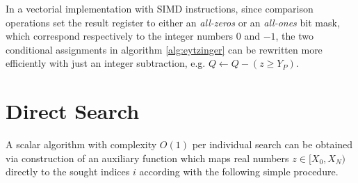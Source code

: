 \documentclass[preprint,1p,times]{elsarticle}
\begin{document}
In a vectorial implementation with SIMD instructions, since comparison operations set the result register to either an \textit{all-zeros} or an \textit{all-ones} bit mask, which correspond respectively to the integer numbers $0$ and $-1$, the two conditional assignments in algorithm \ref{alg:eytzinger} can be rewritten more efficiently with just an integer subtraction, e.g. $Q \leftarrow Q - (z \geq Y_P)$.



\section{Direct Search}
\label{sec:directmethod}
A scalar algorithm with complexity $O(1)$ per individual search can be obtained via construction of an auxiliary function which maps real numbers $z\in[X_{0},X_{N})$ directly to the sought indices $i$ according with the following simple procedure.
\end{document}
